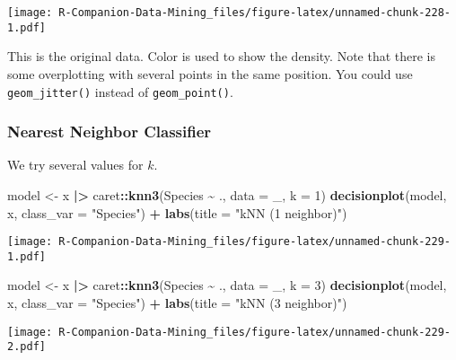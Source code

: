 \documentclass[
  notitlepage]{book}
\newenvironment{Shaded}{\begin{snugshade}}{\end{snugshade}}
\newcommand{\DataTypeTok}[1]{\textcolor[rgb]{0.13,0.29,0.53}{#1}}
\newcommand{\DecValTok}[1]{\textcolor[rgb]{0.00,0.00,0.81}{#1}}
\newcommand{\ErrorTok}[1]{\textcolor[rgb]{0.64,0.00,0.00}{\textbf{#1}}}
\newcommand{\KeywordTok}[1]{\textcolor[rgb]{0.13,0.29,0.53}{\textbf{#1}}}
\newcommand{\NormalTok}[1]{#1}
\newcommand{\OperatorTok}[1]{\textcolor[rgb]{0.81,0.36,0.00}{\textbf{#1}}}
\newcommand{\StringTok}[1]{\textcolor[rgb]{0.31,0.60,0.02}{#1}}
\begin{document}
\texttt{[image: R-Companion-Data-Mining\_files/figure-latex/unnamed-chunk-228-1.pdf]}

This is the original data.
Color is used to show the density.
Note that there is some overplotting with several points in the same position.
You could use \texttt{geom\_jitter()} instead of \texttt{geom\_point()}.

\hypertarget{nearest-neighbor-classifier-1}{%
\subsubsection{Nearest Neighbor Classifier}\label{nearest-neighbor-classifier-1}}

We try several values for \(k\).

\begin{Shaded}
\begin{Highlighting}[]
\NormalTok{model \textless{}{-}}\StringTok{ }\NormalTok{x }\OperatorTok{|}\ErrorTok{\textgreater{}}\StringTok{ }\NormalTok{caret}\OperatorTok{::}\KeywordTok{knn3}\NormalTok{(Species }\OperatorTok{\textasciitilde{}}\StringTok{ }\NormalTok{., }\DataTypeTok{data =}\NormalTok{ \_, }\DataTypeTok{k =} \DecValTok{1}\NormalTok{)}
\KeywordTok{decisionplot}\NormalTok{(model, x, }\DataTypeTok{class\_var =} \StringTok{"Species"}\NormalTok{) }\OperatorTok{+}\StringTok{ }
\StringTok{  }\KeywordTok{labs}\NormalTok{(}\DataTypeTok{title =} \StringTok{"kNN (1 neighbor)"}\NormalTok{)}
\end{Highlighting}
\end{Shaded}

\texttt{[image: R-Companion-Data-Mining\_files/figure-latex/unnamed-chunk-229-1.pdf]}

\begin{Shaded}
\begin{Highlighting}[]
\NormalTok{model \textless{}{-}}\StringTok{ }\NormalTok{x }\OperatorTok{|}\ErrorTok{\textgreater{}}\StringTok{ }\NormalTok{caret}\OperatorTok{::}\KeywordTok{knn3}\NormalTok{(Species }\OperatorTok{\textasciitilde{}}\StringTok{ }\NormalTok{., }\DataTypeTok{data =}\NormalTok{ \_, }\DataTypeTok{k =} \DecValTok{3}\NormalTok{)}
\KeywordTok{decisionplot}\NormalTok{(model, x, }\DataTypeTok{class\_var =} \StringTok{"Species"}\NormalTok{) }\OperatorTok{+}\StringTok{ }
\StringTok{  }\KeywordTok{labs}\NormalTok{(}\DataTypeTok{title =} \StringTok{"kNN (3 neighbor)"}\NormalTok{)}
\end{Highlighting}
\end{Shaded}

\texttt{[image: R-Companion-Data-Mining\_files/figure-latex/unnamed-chunk-229-2.pdf]}
\end{document}
